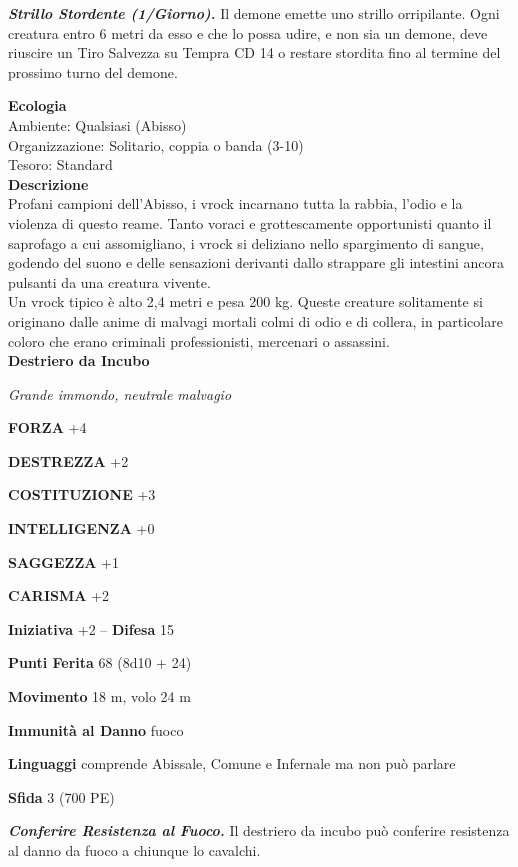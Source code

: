 \begin{multicols}{2}
\emph{\textbf{Strillo Stordente (1/Giorno).}} Il demone emette uno strillo orripilante. Ogni creatura entro 6 metri da esso e che lo possa udire, e non sia un demone, deve riuscire un Tiro Salvezza su Tempra CD 14 o restare stordita fino al termine del prossimo turno del demone.

\textbf{Ecologia}\\
Ambiente: Qualsiasi (Abisso)\\
Organizzazione: Solitario, coppia o banda (3-10)\\
Tesoro: Standard\\
\textbf{Descrizione}\\
Profani campioni dell'Abisso, i vrock incarnano tutta la rabbia, l'odio e la violenza di questo reame. Tanto voraci e grottescamente opportunisti quanto il saprofago a cui assomigliano, i vrock si deliziano nello spargimento di sangue, godendo del suono e delle sensazioni derivanti dallo strappare gli intestini ancora pulsanti da una creatura vivente.\\
Un vrock tipico è alto 2,4 metri e pesa 200 kg. Queste creature solitamente si originano dalle anime di malvagi mortali colmi di odio e di collera, in particolare coloro che erano criminali professionisti, mercenari o assassini.\\



\medskip{}\textbf{Destriero da Incubo}

\emph{Grande immondo, neutrale malvagio}

\textbf{FORZA} +4

\textbf{DESTREZZA} +2

\textbf{COSTITUZIONE} +3

\textbf{INTELLIGENZA} +0

\textbf{SAGGEZZA} +1

\textbf{CARISMA} +2

\textbf{Iniziativa} +2 -- \textbf{Difesa} 15

\textbf{Punti Ferita} 68 (8d10 + 24)

\textbf{Movimento} 18 m, volo 24 m

\textbf{Immunità al Danno} fuoco

\textbf{Linguaggi} comprende Abissale, Comune e Infernale ma non può parlare

\textbf{Sfida} 3 (700 PE)

\emph{\textbf{Conferire Resistenza al Fuoco.}} Il destriero da incubo può conferire resistenza al danno da fuoco a chiunque lo cavalchi.


\end{multicols}
